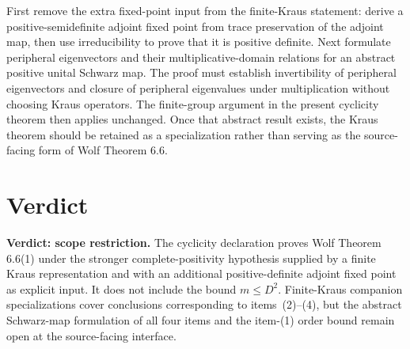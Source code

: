 \documentclass[11pt]{article}
\begin{document}
First remove the extra fixed-point input from the finite-Kraus statement:
derive a positive-semidefinite adjoint fixed point from trace preservation of
the adjoint map, then use irreducibility to prove that it is positive definite.
Next formulate peripheral eigenvectors and their multiplicative-domain
relations for an abstract positive unital Schwarz map. The proof must establish
invertibility of peripheral eigenvectors and closure of peripheral eigenvalues
under multiplication without choosing Kraus operators. The finite-group
argument in the present cyclicity theorem then applies unchanged. Once that
abstract result exists, the Kraus theorem should be retained as a
specialization rather than serving as the source-facing form of Wolf Theorem
6.6.

\section{Verdict}

\textbf{Verdict: scope restriction.} The cyclicity declaration proves Wolf
Theorem 6.6(1) under the stronger complete-positivity hypothesis supplied by a
finite Kraus representation and with an additional positive-definite adjoint
fixed point as explicit input. It does not include the bound $m\leq D^2$.
Finite-Kraus companion specializations cover conclusions corresponding to
items~(2)--(4), but the abstract Schwarz-map formulation of all four items and
the item-(1) order bound remain open at the source-facing interface.
\end{document}
